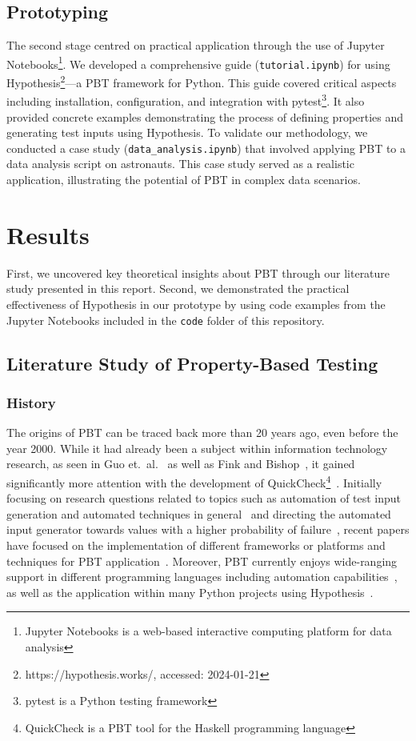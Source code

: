 \documentclass[runningheads]{llncs}
\begin{document}
\subsection{Prototyping}
The second stage centred on practical application through the use of Jupyter Notebooks\footnote{Jupyter Notebooks is a web-based interactive computing platform for data analysis}. We developed a comprehensive guide (\texttt{tutorial.ipynb}) for using Hypothesis\footnote{https://hypothesis.works/, accessed: 2024-01-21}---a PBT framework for Python. This guide covered critical aspects including installation, configuration, and integration with pytest\footnote{pytest is a Python testing framework}. It also provided concrete examples demonstrating the process of defining properties and generating test inputs using Hypothesis. To validate our methodology, we conducted a case study (\texttt{data\_analysis.ipynb}) that involved applying PBT to a data analysis script on astronauts. This case study served as a realistic application, illustrating the potential of PBT in complex data scenarios.

\section{Results}
First, we uncovered key theoretical insights about PBT through our literature study presented in this report. Second, we demonstrated the practical effectiveness of Hypothesis in our prototype by using code examples from the Jupyter Notebooks included in the \texttt{code} folder of this repository.

\subsection{Literature Study of Property-Based Testing}
\subsubsection{History}
The origins of PBT can be traced back more than 20 years ago, even before the year 2000. While it had already been a subject within information technology research, as seen in Guo et.~al.~\cite{Guo1999} as well as Fink and Bishop~\cite{Fink1997}, it gained significantly more attention with the development of QuickCheck\footnote{QuickCheck is a PBT tool for the Haskell programming language}~\cite{Shi2023,Guo1999,Fink1997,MacIver2019,Honarvar2020}. Initially focusing on research questions related to topics such as automation of test input generation and automated techniques in general~\cite{Fink1997} and directing the automated input generator towards values with a higher probability of failure~\cite{Loescher2017}, recent papers have focused on the implementation of different frameworks or platforms and techniques for PBT application~\cite{Padhye2019,Honarvar2020,Shi2023,Corgozinho2023}. Moreover, PBT currently enjoys wide-ranging support in different programming languages including automation capabilities~\cite{Chen2022,Padhye2019,Honarvar2020,ElazarMittelman2023,Shi2023}, as well as the application within many Python projects using Hypothesis~\cite{Corgozinho2023}.
\end{document}
